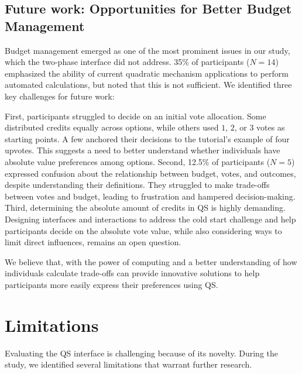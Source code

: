 \subsection{Future work: Opportunities for Better Budget Management}
Budget management emerged as one of the most prominent issues in our study, which the two-phase interface did not address. 35\% of participants ($N=14$) emphasized the ability of current quadratic mechanism applications to perform automated calculations, but noted that this is not sufficient.  We identified three key challenges for future work:

First, participants struggled to decide on an initial vote allocation. Some distributed credits equally across options, while others used $1$, $2$, or $3$ votes as starting points. A few anchored their decisions to the tutorial's example of four upvotes. This suggests a need to better understand whether individuals have absolute value preferences among options. Second, 12.5\% of participants ($N=5$) expressed confusion about the relationship between budget, votes, and outcomes, despite understanding their definitions. They struggled to make trade-offs between votes and budget, leading to frustration and hampered decision-making. Third, determining the absolute amount of credits in QS is highly demanding. Designing interfaces and interactions to address the cold start challenge and help participants decide on the absolute vote value, while also considering ways to limit direct influences, remains an open question.

We believe that, with the power of computing and a better understanding of how individuals calculate trade-offs can provide innovative solutions to help participants more easily express their preferences using QS.

\section{Limitations}
\label{sec:limitations}
Evaluating the QS interface is challenging because of its novelty. During the study, we identified several limitations that warrant further research.

